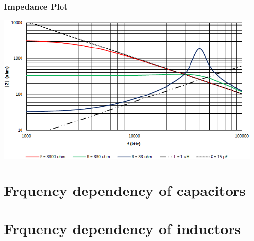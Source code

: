 \documentclass{beamer}
\begin{document}
	\begin{frame}
    \frametitle{Impedance Plot}

		\begin{center}
			\includegraphics[scale=0.62]{obr02_impedanceR.png}
		\end{center}
	\end{frame}
\section{\texorpdfstring{Frquency dependency of capacitors}{Frquency dependency of capacitors}}
\section{\texorpdfstring{Frquency dependency of inductors}{Frquency dependency of inductors}}
\end{document}
